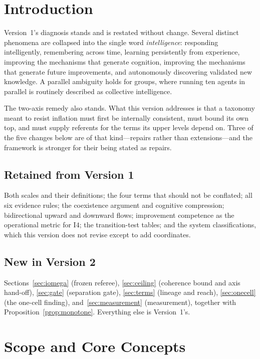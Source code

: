 \documentclass[11pt]{article}
\newcommand{\Ilev}[1]{\ensuremath{\mathrm{I}#1}}
\begin{document}
\tableofcontents
\bigskip

\section{Introduction}

Version~1's diagnosis stands and is restated without change. Several distinct phenomena are collapsed into the single word \emph{intelligence}: responding intelligently, remembering across time, learning persistently from experience, improving the mechanisms that generate cognition, improving the mechanisms that generate future improvements, and autonomously discovering validated new knowledge. A parallel ambiguity holds for groups, where running ten agents in parallel is routinely described as collective intelligence.

The two-axis remedy also stands. What this version addresses is that a taxonomy meant to resist inflation must first be internally consistent, must bound its own top, and must supply referents for the terms its upper levels depend on. Three of the five changes below are of that kind---repairs rather than extensions---and the framework is stronger for their being stated as repairs.

\subsection{Retained from Version 1}

Both scales and their definitions; the four terms that should not be conflated; all six evidence rules; the coexistence argument and cognitive compression; bidirectional upward and downward flows; improvement competence as the operational metric for \Ilev{4}; the transition-test tables; and the system classifications, which this version does not revise except to add coordinates.

\subsection{New in Version 2}

Sections~\ref{sec:iomega} (frozen referee), \ref{sec:ceiling} (coherence bound and axis hand-off), \ref{sec:gate} (separation gate), \ref{sec:terms} (lineage and reach), \ref{sec:onecell} (the one-cell finding), and~\ref{sec:measurement} (measurement), together with Proposition~\ref{prop:monotone}. Everything else is Version~1's.

\section{Scope and Core Concepts}
\end{document}
